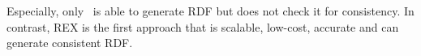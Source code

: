 \documentclass{llncs}
\begin{document}
Especially, only~\cite{conf/aaaiss/ParundekarKA10} is able to generate RDF but does not check it for consistency.
In contrast, REX is the first approach that is scalable, low-cost, accurate and can generate consistent RDF. 
%
%
%
%

\end{document}
